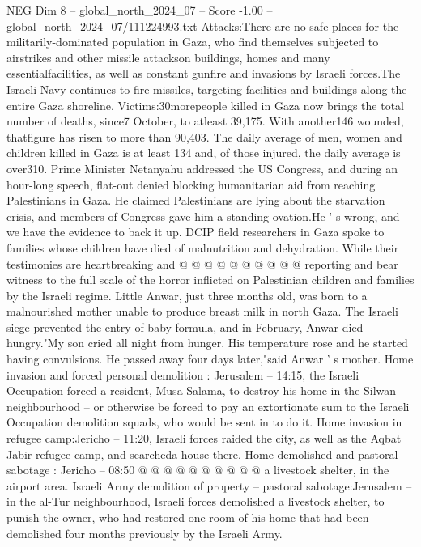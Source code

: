 \begin{textsample}{NEG Dim 8 – global\_north\_2024\_07 – Score -1.00 – global\_north\_2024\_07/111224993.txt}  \label{ex:f8_neg_415}
Attacks:There are no safe places for the militarily-dominated population in Gaza, who find themselves subjected to airstrikes and other missile attackson buildings, homes and many essentialfacilities, as well as constant gunfire and invasions by Israeli forces.The Israeli Navy continues to fire missiles, targeting facilities and buildings along the entire Gaza shoreline.
Victims:30morepeople killed in Gaza now brings the total number of deaths, since7 October, to atleast 39,175.
With another146 wounded, thatfigure has risen to more than 90,403.
The daily average of men, women and children killed in Gaza is at least 134 and, of those injured, the daily average is over310.
Prime Minister Netanyahu addressed the US Congress, and during an hour-long speech, flat-out denied blocking humanitarian aid from reaching Palestinians in Gaza.
He claimed Palestinians are lying about the starvation crisis, and members of Congress gave him a standing ovation.He ' s wrong, and we have the evidence to back it up.
DCIP field researchers in Gaza spoke to families whose children have died of malnutrition and dehydration.
While their testimonies are heartbreaking and @ @ @ @ @ @ @ @ @ @ reporting and bear witness to the full scale of the horror inflicted on Palestinian children and families by the Israeli regime.
Little Anwar, just three months old, was born to a malnourished mother unable to produce breast milk in north Gaza.
The Israeli siege prevented the entry of baby formula, and in February, Anwar died hungry."My son cried all night from hunger.
His temperature rose and he started having convulsions.
He passed away four days later,"said Anwar ' s mother.
Home invasion and forced personal demolition : Jerusalem -- 14:15, the Israeli Occupation forced a resident, Musa Salama, to destroy his home in the Silwan neighbourhood -- or otherwise be forced to pay an extortionate sum to the Israeli Occupation demolition squads, who would be sent in to do it.
Home invasion in refugee camp:Jericho -- 11:20, Israeli forces raided the city, as well as the Aqbat Jabir refugee camp, and searcheda house there.
Home demolished and pastoral sabotage : Jericho -- 08:50 @ @ @ @ @ @ @ @ @ @ a livestock shelter, in the airport area.
Israeli Army demolition of property -- pastoral sabotage:Jerusalem -- in the al-Tur neighbourhood, Israeli forces demolished a livestock shelter, to punish the owner, who had restored one room of his home that had been demolished four months previously by the Israeli Army.

\end{textsample}
